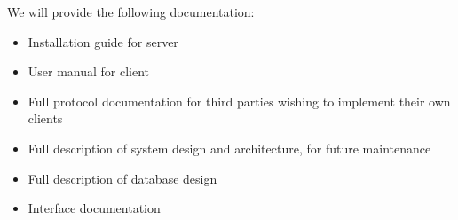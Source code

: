 We will provide the following documentation:
\begin{itemize}
\item Installation guide for server
\item User manual for client
\item Full protocol documentation for third parties wishing to implement their
      own clients
\item Full description of system design and architecture, for future
      maintenance
\item Full description of database design
\item Interface documentation 
\end{itemize}
